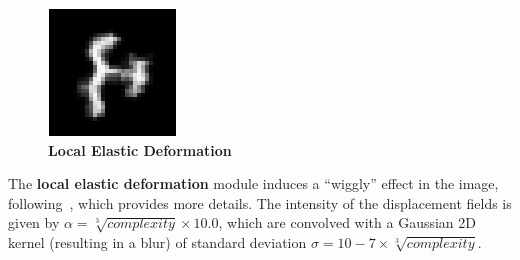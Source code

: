\documentclass{article} %
\begin{document}
\begin{minipage}[h]{\linewidth}
\begin{figure}
\begin{center}
\vspace*{-4mm}
\includegraphics[scale=.4]{images/Localelasticdistorsions_only.png}\\
{\bf Local Elastic Deformation}
\end{center}
\end{figure}
The {\bf local elastic deformation}
module induces a ``wiggly'' effect in the image, following~\citet{SimardSP03-short},
which provides more details. 
The intensity of the displacement fields is given by 
$\alpha = \sqrt[3]{complexity} \times 10.0$, which are 
convolved with a Gaussian 2D kernel (resulting in a blur) of
standard deviation $\sigma = 10 - 7 \times\sqrt[3]{complexity}$.
\end{minipage}

\vspace*{7mm}
\end{document}
